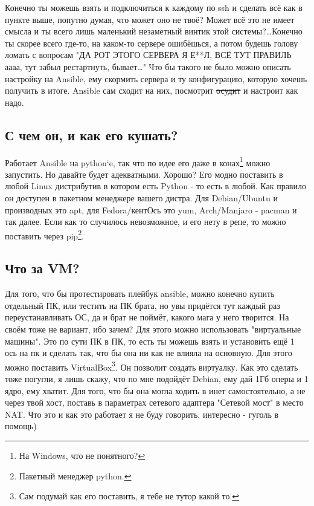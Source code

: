             Конечно ты можешь взять и подключиться к каждому по ssh и сделать всё как в пункте выше, попутно думая, что может оно не твоё? Может всё это не имеет смысла и ты всего лишь маленький незаметный винтик этой системы?\dots Конечно ты скорее всего где-то, на каком-то сервере ошибёшься, а потом будешь голову ломать с вопросам "ДА РОТ ЭТОГО СЕРВЕРА Я Е**Л, ВСЁ ТУТ ПРАВИЛЬ аааа, тут забыл рестартнуть, бывает\dots" Что бы такого не было можно описать настройку на Ansible, ему скормить сервера и ту конфигурацию, которую хочешь получить в итоге. Ansible сам сходит на них, посмотрит \sout{осудит} и настроит как надо.

        \subsection{С чем он, и как его кушать?}
            Работает Ansible на python`e, так что по идее его даже в конах\footnote{На Windows, что не понятного?} можно запустить. Но давайте будет адекватными. Хорошо? Его модно поставить в любой Linux дистрибутив в котором есть Python - то есть в любой. Как правило он доступен в пакетном менеджере вашего дистра. Для Debian/Ubuntu и производных это apt, для Fedora/кентОсь это yum, Arch/Manjaro - pacman и так далее. Если как то случилось невозможное, и его нету в репе, то можно поставить через pip\footnote{Пакетный менеджер python.}.

        \subsection{Что за VM?}
            Для того, что бы протестировать плейбук ansible, можно конечно купить отдельный ПК, или тестить на ПК брата, но увы придётся тут каждый раз переустанавливать ОС, да и брат не поймёт, какого мага у него творится. На своём тоже не вариант, ибо зачем? Для этого можно использовать "виртуальные машины". Это по сути ПК в ПК, то есть ты можешь взять и установить ещё 1 ось на пк и сделать так, что бы она ни как не влияла на основную. Для этого можно поставить VirtualBox\footnote{Сам подумай как его поставить, я тебе не тутор какой то.}. Он позволит создать виртуалку. Как это сделать тоже погугли, я лишь скажу, что по мне подойдёт Debian, ему дай 1Гб оперы и 1 ядро, ему хватит. Для того, что бы она могла ходить в инет самостоятельно, а не через твой хост, поставь в параметрах сетевого адаптера "Сетевой мост" в место NAT. Что это и как это работает я не буду говорить, интересно - гуголь в помощь)

